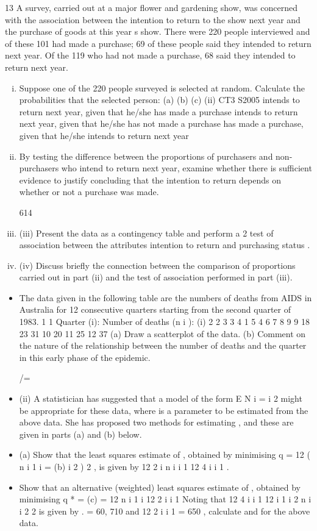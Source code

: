 \documentclass[a4paper,12pt]{article}
\begin{document}
13
A survey, carried out at a major flower and gardening show, was concerned with the association between the intention to return to the show next year and the purchase of goods at this year s show. There were 220 people interviewed and of these 101 had
made a purchase; 69 of these people said they intended to return next year. Of the 119 who had not made a purchase, 68 said they intended to return next year.
\begin{enumerate}[(i)]
\item Suppose one of the 220 people surveyed is selected at random.
Calculate the probabilities that the selected person:
(a)
(b)
(c)
(ii)
CT3 S2005
intends to return next year, given that he/she has made a purchase
intends to return next year, given that he/she has not made a purchase
has made a purchase, given that he/she intends to return next year

\item By testing the difference between the proportions of purchasers and non-purchasers who intend to return next year, examine whether there is sufficient evidence to justify concluding that the intention to return depends on whether
or not a purchase was made.

614
\item (iii) Present the data as a contingency table and perform a 2 test of association between the attributes intention to return and purchasing status .
\item
(iv) Discuss briefly the connection between the comparison of proportions carried out in part (ii) and the test of association performed in part (iii).
\end{enumerate}

\newpage
\begin{itemize}
\item The data given in the following table are the numbers of deaths from AIDS in
Australia for 12 consecutive quarters starting from the second quarter of 1983.
1
1
Quarter (i):
Number of deaths (n i ):
(i)
2
2
3
3
4
1
5
4
6 7 8 9
9 18 23 31
10
20
11
25
12
37
(a) Draw a scatterplot of the data.
(b) Comment on the nature of the relationship between the number of
deaths and the quarter in this early phase of the epidemic.

/=\item (ii)
A statistician has suggested that a model of the form
E N i = i 2
might be appropriate for these data, where is a parameter to be estimated
from the above data. She has proposed two methods for estimating , and
these are given in parts (a) and (b) below.
\item (a)
Show that the least squares estimate of , obtained by minimising
q =
12
( n
i 1 i
=
(b)
i 2 ) 2 , is given by
12 2
i n i
i 1
12 4
i
i 1
.
\item Show that an alternative (weighted) least squares estimate of ,
obtained by minimising q * =
(c)
= 12
n
i 1 i
12 2
i
i 1
Noting that 12 4
i
i 1
12
i 1
i 2
n i
i 2
2
is given by
.
= 60, 710 and
12 2
i
i 1
= 650 , calculate
and
for the above data.
\end{itemize}
\newpage
\end{document}
